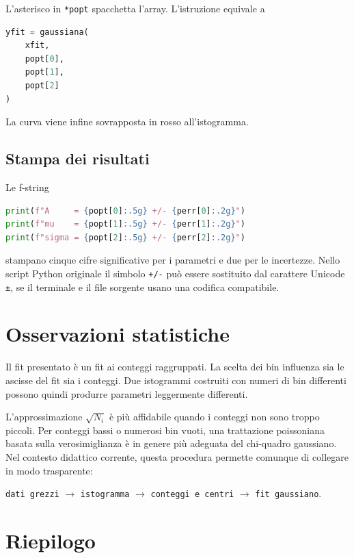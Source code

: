 \documentclass[11pt,a4paper]{book}
\begin{document}
L'asterisco in \texttt{*popt} spacchetta l'array. L'istruzione equivale a

\begin{lstlisting}[language=Python]
yfit = gaussiana(
    xfit,
    popt[0],
    popt[1],
    popt[2]
)
\end{lstlisting}

La curva viene infine sovrapposta in rosso all'istogramma.

\subsection{Stampa dei risultati}

Le f-string

\begin{lstlisting}[language=Python]
print(f"A     = {popt[0]:.5g} +/- {perr[0]:.2g}")
print(f"mu    = {popt[1]:.5g} +/- {perr[1]:.2g}")
print(f"sigma = {popt[2]:.5g} +/- {perr[2]:.2g}")
\end{lstlisting}

stampano cinque cifre significative per i parametri e due per le
incertezze. Nello script Python originale il simbolo \texttt{+/-} può
essere sostituito dal carattere Unicode \texttt{±}, se il terminale e il
file sorgente usano una codifica compatibile.

\section{Osservazioni statistiche}

Il fit presentato è un fit ai conteggi raggruppati. La scelta dei bin
influenza sia le ascisse del fit sia i conteggi. Due istogrammi costruiti
con numeri di bin differenti possono quindi produrre parametri
leggermente differenti.

L'approssimazione $\sqrt{N_i}$ è più affidabile quando i conteggi non
sono troppo piccoli. Per conteggi bassi o numerosi bin vuoti, una
trattazione poissoniana basata sulla verosimiglianza è in genere più
adeguata del chi-quadro gaussiano. Nel contesto didattico corrente,
questa procedura permette comunque di collegare in modo trasparente:

\begin{center}
\texttt{dati grezzi}
$\longrightarrow$
\texttt{istogramma}
$\longrightarrow$
\texttt{conteggi e centri}
$\longrightarrow$
\texttt{fit gaussiano}.
\end{center}

\section{Riepilogo}
\end{document}
